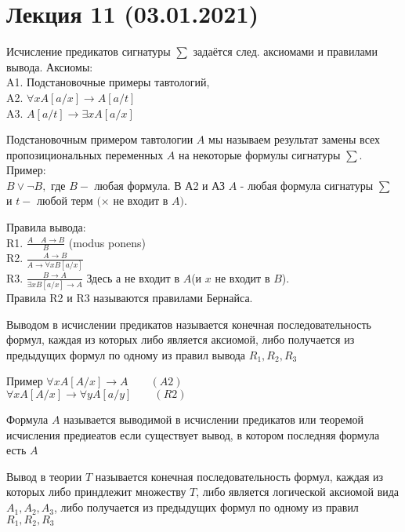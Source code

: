 \section{Лекция 11 (03.01.2021)}

Исчисление предикатов сигнатуры $\sum$ задаётся след. аксиомами и правилами вывода.
\vskip 0.1in
Аксиомы:\\
A1. Подстановочные примеры тавтологий,\\
A2. $\forall x A[a / x] \rightarrow A[a / t]$\\
A3. $A[a / t] \rightarrow \exists x A[a / x]$
\vskip 0.2in

Подстановочным примером тавтологии $A$ мы называем результат замены всех пропозициональных переменных $A$ на некоторые формулы сигнатуры $\sum$.
\vskip 0.1in
Пример:\\
$B \vee \neg B,$ где $B-$ любая формула. В А2 и АЗ $A$ - любая формула сигнатуры $\sum$ и $t-$ любой терм $(\times$ не входит в $A)$.
\vskip 0.2in

Правила вывода:\\
R1. $\frac{A \quad A \rightarrow B}{B}$ (modus ponens)\\
R2. $\frac{A \rightarrow B}{A \rightarrow \forall x B[a / x]}$\\
R3. $\frac{B \rightarrow A}{\exists x B[a / x] \rightarrow A}$
\vskip 0.1in
Здесь а не входит в $A$(и $x$ не входит в $B$).\\
Правила R2 и R3 называются правилами Бернайса.
\vskip 0.2in

\begin{defn}
Выводом в исчислении предикатов называется конечная последовательность формул, каждая из которых либо является аксиомой, либо получается из предыдущих формул по одному из правил вывода $R_1, R_2, R_3$
\end{defn}

Пример
$\forall x A[A / x] \to A\qquad (A2)$\\
$\forall x A[A / x] \to \forall y A[a / y]\qquad (R2)$
\vskip 0.2in

\begin{defn}
Формула $A$ называется выводимой в исчислении предикатов или теоремой исчисления предиеатов если существует вывод, в котором последняя формула есть $A$
\end{defn}

\begin{defn}
Вывод в теории $T$ называется конечная последовательность формул, каждая из которых либо приндлежит множеству $T$, либо является логической аксиомой вида $A_1, A_2, A_3$, либо получается из предыдущих формул по одному из правил $R_1, R_2, R_3$
\end{defn}

